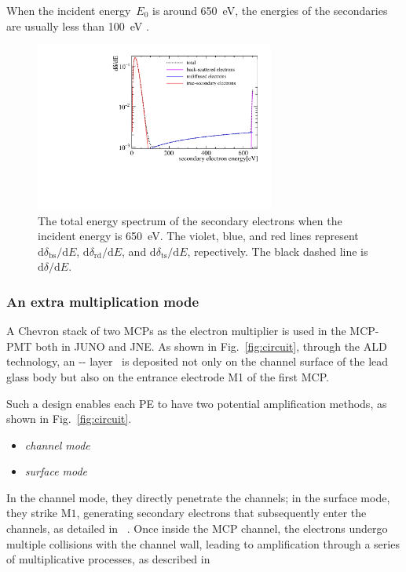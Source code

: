 When the incident energy~$E_0$ is around \SI{650}{eV}, the energies of the secondaries are usually less than \SI{100}{eV} .
\begin{figure}[!htbp]
	\centering
	\includegraphics[width=0.7\textwidth]{PMTRelated/GTmodel/SES.pdf}
	\caption{The total energy spectrum of the secondary electrons when the incident energy is \SI{650}{eV}.
		The violet, blue, and red lines represent $\mathrm{d}\delta_{\mathrm{bs}}/\mathrm{d}E$, $\mathrm{d}\delta_{\mathrm{rd}}/\mathrm{d}E$, and
		$\mathrm{d}\delta_{\mathrm{ts}}/\mathrm{d}E$, repectively.
		The black dashed line is $\mathrm{d}\delta/\mathrm{d}E$.}
	\label{fig:SES}
\end{figure}

\subsubsection{An extra multiplication mode}
A Chevron stack of two MCPs as the electron multiplier is used in the MCP-PMT both in JUNO and JNE.
As shown in Fig.~\ref{fig:circuit}, through the ALD technology, an -- layer~\cite{zzj2021Al} is deposited not only on the channel surface of the lead glass body
but also on the entrance electrode M1 of the first MCP.

Such a design enables each PE to have two potential amplification methods, as shown in Fig.~\ref{fig:circuit}.
\begin{itemize}
	\item \textit{channel mode}
	\item \textit{surface mode}
\end{itemize}
In the channel mode, they directly penetrate the channels; in the surface mode, they strike $\mathrm{M}1$, generating secondary electrons that subsequently enter the channels, as detailed in ~\cite{2016Optimization}. Once inside the MCP channel, the electrons undergo multiple collisions with the channel wall, leading to amplification through a series of multiplicative processes, as described in~\cite{1955Scintillation}

